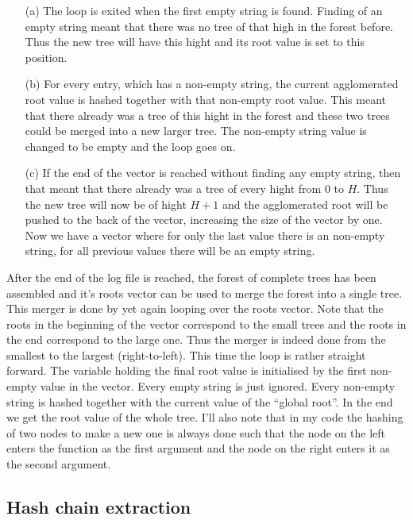 \documentclass[11pt]{article}
\begin{document}
\begin{itemize}
 	\item[(a)] The loop is exited when the first empty string is found. Finding of an empty string meant that there was no tree of that high in the forest before. Thus the new tree will have this hight and its root value is set to this position.   
 	\item[(b)] For every entry, which has a non-empty string, the current agglomerated root value is hashed together with that non-empty root value. This meant that there already was a tree of this hight in the forest and these two trees could be merged into a new larger tree. The non-empty string value is changed to be empty and the loop goes on.
 	\item[(c)] If the end of the vector is reached without finding any empty string, then that meant that there already was a tree of every hight from $0$ to $H$. Thus the new tree will now be of hight $H+1$ and the agglomerated root will be pushed to the back of the vector, increasing the size of the vector by one. Now we have a vector where for only the last value there is an non-empty string, for all previous values there will be an empty string. 
\end{itemize} 

After the end of the log file is reached, the forest of complete trees has been assembled and it's roots vector can be used to merge the forest into a single tree. This merger is done by yet again looping over the roots vector. Note that the roots in the beginning of the vector correspond to the small trees and the roots in the end correspond to the large one. Thus the merger is indeed done from the smallest to the largest (right-to-left). This time the loop is rather straight forward. The variable holding the final root value is initialised by the first non-empty value in the vector. Every empty string is just ignored. Every non-empty string is hashed together with the current value of the ``global root''. In the end we get the root value of the whole tree. I'll also note that in my code the hashing of two nodes to make a new one is always done such that the node on the left enters the function as the first argument and the node on the right enters it as the second argument. 



\subsection{Hash chain extraction} %
\label{sub:hash_chain_extraction}
\end{document}
